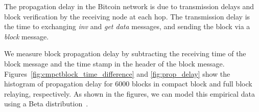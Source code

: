 


 The propagation delay in the Bitcoin network is due to transmission delays and block verification by the receiving node at each hop. The transmission delay is the time to exchanging \textit{inv} and \textit{get data} messages, and sending the block via a \textit{block} message. 

 We measure block propagation delay by subtracting the receiving time of the block message and the time stamp in the header of the block message. Figures~\ref{fig:cmpctblock_time_difference} and \ref{fig:prop_delay} show the histogram of propagation delay for  $6000$ blocks in compact block and full block relaying, respectively. 
As shown in the figures, we can model this empirical data using a Beta distribution~\cite{probabilitybook}. %

